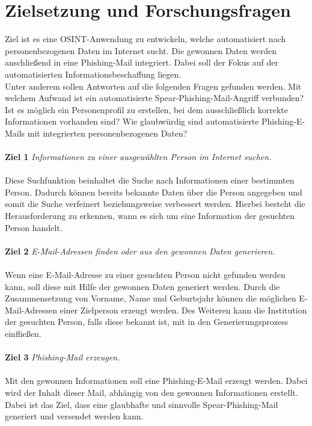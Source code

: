 \section{Zielsetzung und Forschungsfragen}
\label {sec:Zielsetzung}
Ziel ist es eine OSINT-Anwendung zu entwickeln, welche automatisiert nach personenbezogenen Daten im Internet sucht. Die gewonnen Daten werden anschließend in eine Phishing-Mail integriert. Dabei soll der Fokus auf der automatisierten Informationsbeschaffung liegen.\\ 
Unter anderem sollen Antworten auf die folgenden Fragen gefunden werden. Mit welchem Aufwand ist ein automatisierte Spear-Phishing-Mail-Angriff verbunden? Ist es möglich ein Personenprofil zu erstellen, bei dem ausschließlich korrekte Informationen vorhanden sind? Wie glaubwürdig sind automatisierte Phishing-E-Mails mit integrierten personenbezogenen Daten?
 \\\\
 {\bf Ziel 1} \textit{Informationen zu einer ausgewählten Person im Internet suchen.}\\\\
 Diese Suchfunktion beinhaltet die Suche nach Informationen einer bestimmten Person. Dadurch können bereits bekannte Daten über die Person angegeben und somit die Suche verfeinert beziehungsweise verbessert werden. Hierbei besteht die Herausforderung zu erkennen, wann es sich um eine Information der gesuchten Person handelt.\\\\
 {\bf Ziel 2} \textit{E-Mail-Adressen finden oder aus den gewonnen Daten generieren.}\\\\
 Wenn eine E-Mail-Adresse zu einer gesuchten Person nicht gefunden werden kann, soll diese mit Hilfe der gewonnen Daten generiert werden. Durch die Zusammensetzung von Vorname, Name und Geburtsjahr können die möglichen E-Mail-Adressen einer Zielperson erzeugt werden. Des Weiteren kann die Institution der gesuchten Person, falls diese bekannt ist, mit in den Generierungsprozess einfließen.\\\\
 {\bf Ziel 3} \textit{Phishing-Mail erzeugen.}\\\\
 Mit den gewonnen Informationen soll eine Phishing-E-Mail erzeugt werden. Dabei wird der Inhalt dieser Mail, abhängig von den gewonnen Informationen erstellt. Dabei ist das Ziel, dass eine glaubhafte und sinnvolle Spear-Phishing-Mail generiert und versendet werden kann.
 

